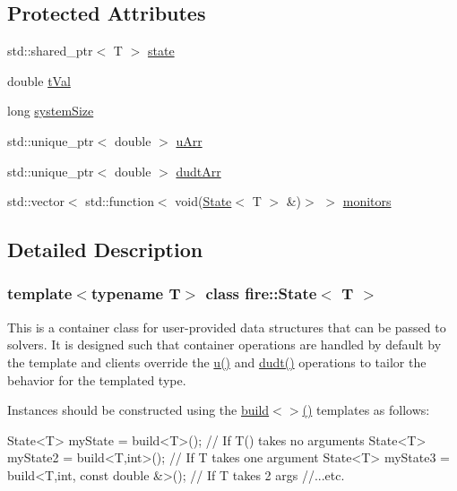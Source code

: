 \subsection*{Protected Attributes}
\begin{DoxyCompactItemize}
\item 
std\+::shared\+\_\+ptr$<$ T $>$ \hyperlink{a00818_a9a75139f1d613abc9fb82600757087f6}{state}
\item 
double \hyperlink{a00818_a4985617940993cea772a7fc977c87237}{t\+Val}
\item 
long \hyperlink{a00818_a08f8f4ea745ae855ef730896efabf1ae}{system\+Size}
\item 
std\+::unique\+\_\+ptr$<$ double $>$ \hyperlink{a00818_aae89d6e350df763d503d7da862f1f30a}{u\+Arr}
\item 
std\+::unique\+\_\+ptr$<$ double $>$ \hyperlink{a00818_a9954ba8c1a12555ca1bf67b6a2bf2b3b}{dudt\+Arr}
\item 
std\+::vector$<$ std\+::function$<$ void(\hyperlink{a00818}{State}$<$ T $>$ \&)$>$ $>$ \hyperlink{a00818_ae1571b0a1c82060e525ce6ce2119ae5e}{monitors}
\end{DoxyCompactItemize}


\subsection{Detailed Description}
\subsubsection*{template$<$typename T$>$\newline
class fire\+::\+State$<$ T $>$}

This is a container class for user-\/provided data structures that can be passed to solvers. It is designed such that container operations are handled by default by the template and clients override the \hyperlink{a00818_a54507a9e31127580a2c485ce9829934e}{u()} and \hyperlink{a00818_a4d20304931607c1cb27358fb3776a620}{dudt()} operations to tailor the behavior for the templated type.

Instances should be constructed using the \hyperlink{a00171_abca66b4f2a1543308b663714bd8b4855}{build$<$$>$()} templates as follows\+: 
\begin{DoxyCode}
State<T> myState = build<T>(); \textcolor{comment}{// If T() takes no arguments}
State<T> myState2 = build<T,int>(); \textcolor{comment}{// If T takes one argument}
State<T> myState3 = build<T,int, const double &>(); \textcolor{comment}{// If T takes 2 args}
\textcolor{comment}{//...etc.}
\end{DoxyCode}


